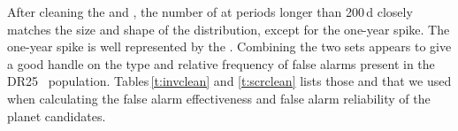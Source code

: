 
After cleaning the  and , the number of  at periods longer than 200\,d closely matches the size and shape of the \opstce{} distribution, except for the one-year spike. The one-year spike is well represented by the .  Combining the two sets appears to give a good handle on the type and relative frequency of false alarms present in the DR25 \opstce\ population. Tables\,\ref{t:invclean} and \ref{t:scrclean} lists those  and  that we used when calculating the false alarm effectiveness and false alarm reliability of the planet candidates.


